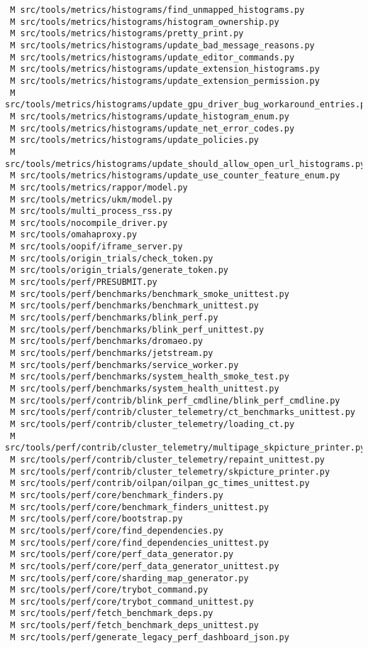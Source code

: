 \documentclass{article}
\begin{document}
\begin{verbatim}
 M src/tools/metrics/histograms/find_unmapped_histograms.py
 M src/tools/metrics/histograms/histogram_ownership.py
 M src/tools/metrics/histograms/pretty_print.py
 M src/tools/metrics/histograms/update_bad_message_reasons.py
 M src/tools/metrics/histograms/update_editor_commands.py
 M src/tools/metrics/histograms/update_extension_histograms.py
 M src/tools/metrics/histograms/update_extension_permission.py
 M src/tools/metrics/histograms/update_gpu_driver_bug_workaround_entries.py
 M src/tools/metrics/histograms/update_histogram_enum.py
 M src/tools/metrics/histograms/update_net_error_codes.py
 M src/tools/metrics/histograms/update_policies.py
 M src/tools/metrics/histograms/update_should_allow_open_url_histograms.py
 M src/tools/metrics/histograms/update_use_counter_feature_enum.py
 M src/tools/metrics/rappor/model.py
 M src/tools/metrics/ukm/model.py
 M src/tools/multi_process_rss.py
 M src/tools/nocompile_driver.py
 M src/tools/omahaproxy.py
 M src/tools/oopif/iframe_server.py
 M src/tools/origin_trials/check_token.py
 M src/tools/origin_trials/generate_token.py
 M src/tools/perf/PRESUBMIT.py
 M src/tools/perf/benchmarks/benchmark_smoke_unittest.py
 M src/tools/perf/benchmarks/benchmark_unittest.py
 M src/tools/perf/benchmarks/blink_perf.py
 M src/tools/perf/benchmarks/blink_perf_unittest.py
 M src/tools/perf/benchmarks/dromaeo.py
 M src/tools/perf/benchmarks/jetstream.py
 M src/tools/perf/benchmarks/service_worker.py
 M src/tools/perf/benchmarks/system_health_smoke_test.py
 M src/tools/perf/benchmarks/system_health_unittest.py
 M src/tools/perf/contrib/blink_perf_cmdline/blink_perf_cmdline.py
 M src/tools/perf/contrib/cluster_telemetry/ct_benchmarks_unittest.py
 M src/tools/perf/contrib/cluster_telemetry/loading_ct.py
 M src/tools/perf/contrib/cluster_telemetry/multipage_skpicture_printer.py
 M src/tools/perf/contrib/cluster_telemetry/repaint_unittest.py
 M src/tools/perf/contrib/cluster_telemetry/skpicture_printer.py
 M src/tools/perf/contrib/oilpan/oilpan_gc_times_unittest.py
 M src/tools/perf/core/benchmark_finders.py
 M src/tools/perf/core/benchmark_finders_unittest.py
 M src/tools/perf/core/bootstrap.py
 M src/tools/perf/core/find_dependencies.py
 M src/tools/perf/core/find_dependencies_unittest.py
 M src/tools/perf/core/perf_data_generator.py
 M src/tools/perf/core/perf_data_generator_unittest.py
 M src/tools/perf/core/sharding_map_generator.py
 M src/tools/perf/core/trybot_command.py
 M src/tools/perf/core/trybot_command_unittest.py
 M src/tools/perf/fetch_benchmark_deps.py
 M src/tools/perf/fetch_benchmark_deps_unittest.py
 M src/tools/perf/generate_legacy_perf_dashboard_json.py

\end{verbatim}
\end{document}
